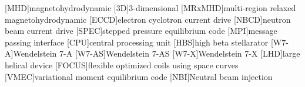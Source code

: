 \begin{acronym}
	
[MHD]{magnetohydrodynamic}
[3D]{3-dimensional}
[MRxMHD]{multi-region relaxed magnetohydrodynamic}
[ECCD]{electron cyclotron current drive}
[NBCD]{neutron beam current drive}
[SPEC]{stepped pressure equilibrium code}
[MPI]{message passing interface}
[CPU]{central processing unit}
[HBS]{high beta stellarator}
[W7-A]{Wendelstein 7-A}
[W7-AS]{Wendelstein 7-AS}
[W7-X]{Wendelstein 7-X}
[LHD]{large helical device}
[FOCUS]{flexible optimized coils using space curves}
[VMEC]{variational moment equilibrium code}
[NBI]{Neutral beam injection}

\end{acronym}